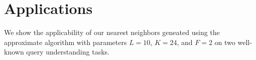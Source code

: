 \section{Applications}
We show the applicability of our nearest neighbors geneated using the approximate \dbflip algorithm with parameters $L=10$, $K=24$, and $F=2$ on two well-known query understanding tasks. 


